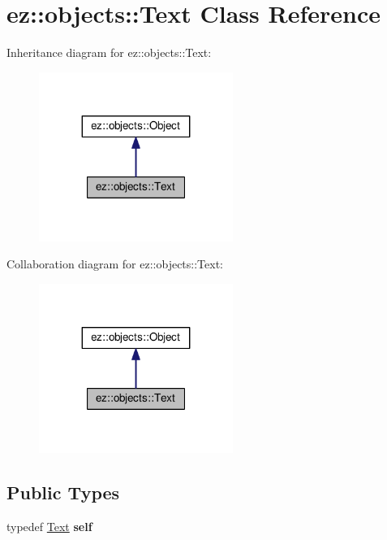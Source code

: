 \hypertarget{classez_1_1objects_1_1Text}{}\section{ez\+:\+:objects\+:\+:Text Class Reference}
\label{classez_1_1objects_1_1Text}


Inheritance diagram for ez\+:\+:objects\+:\+:Text\+:
\nopagebreak
\begin{figure}[H]
\begin{center}
\leavevmode
\includegraphics[width=179pt]{classez_1_1objects_1_1Text__inherit__graph}
\end{center}
\end{figure}


Collaboration diagram for ez\+:\+:objects\+:\+:Text\+:
\nopagebreak
\begin{figure}[H]
\begin{center}
\leavevmode
\includegraphics[width=179pt]{classez_1_1objects_1_1Text__coll__graph}
\end{center}
\end{figure}
\subsection*{Public Types}
\begin{DoxyCompactItemize}
\item 
\mbox{\label{classez_1_1objects_1_1Text_ae38eeab4094294b3761191540d9c4aa0}} 
typedef \hyperlink{classez_1_1objects_1_1Text}{Text} {\bfseries self}
\end{DoxyCompactItemize}
